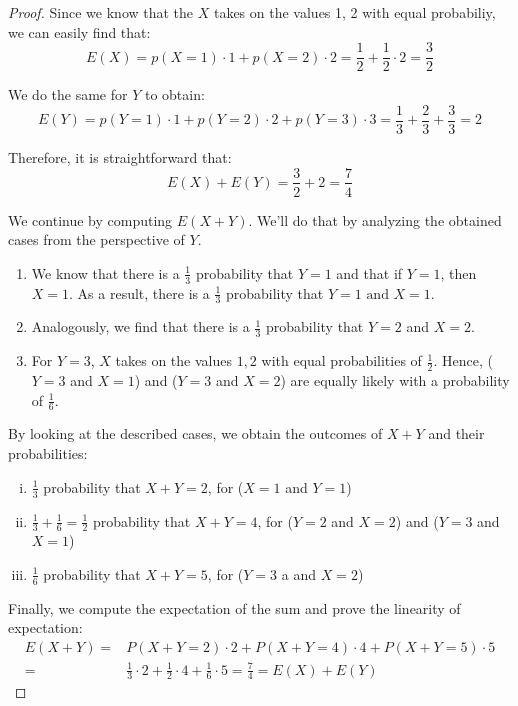 \begin{proof}
    Since we know that the $X$ takes on the values 1, 2 with equal probabiliy, we can easily find that:
     \[
         E(X) = p(X = 1) \cdot 1 + p(X = 2) \cdot 2 = \frac{1}{2} + \frac{1}{2} \cdot 2 =\frac{3}{2}
    \] 

    We do the same for $Y$ to obtain:
    \[
        E(Y) = p(Y = 1) \cdot 1 + p(Y = 2) \cdot 2 + p(Y = 3) \cdot 3 
        = \frac{1}{3} + \frac{2}{3} + \frac{3}{3} = 2
    \] 

    Therefore, it is straightforward that:
    \[
        E(X) + E(Y) = \frac{3}{2} + 2 = \frac{7}{4}
    \] 

    We continue by computing $E(X + Y)$. We'll do that by analyzing the obtained cases from the perspective
    of  $Y$. 
    \begin{enumerate}[(1)]
        \item We know that there is a  $\frac{1}{3}$ probability that $Y = 1$ and that if $Y = 1$, then $X = 1$.
            As a result, there is a $\frac{1}{3}$ probability that $Y = 1 \text{ and } X = 1$.

        \item Analogously, we find that there is a $\frac{1}{3}$ probability that $Y = 2$ and $X = 2$.

        \item For $Y = 3$, $X$ takes on the values $1, 2$ with equal probabilities of $\frac{1}{2}$. Hence,
            ($Y = 3$ and $X = 1$) and ($Y = 3$ and $X = 2$) are equally likely with a probability 
            of $\frac{1}{6}$.  
    \end{enumerate}

    By looking at the described cases, we obtain the outcomes of $X + Y$ and their probabilities:
    \begin{enumerate}[(i)]
        \item $\frac{1}{3}$ probability that $X + Y = 2$, for ($X = 1$ and $Y = 1$)

        \item $\frac{1}{3} + \frac{1}{6} = \frac{1}{2}$ probability that $X + Y = 4$, for ($Y = 2$ and $X = 2$)
    and ($Y = 3$ and  $X = 1$)

    \item $\frac{1}{6}$ probability that $X + Y = 5$, for ($Y = 3$ a and $X = 2$)
    \end{enumerate}

    Finally, we compute the expectation of the sum and prove the linearity of expectation:
    \begin{align*}
        E(X + Y) =& P(X + Y = 2) \cdot 2 + P(X + Y = 4) \cdot 4 + P(X + Y = 5) \cdot 5 \\
        =& \frac{1}{3} \cdot 2 + \frac{1}{2} \cdot 4 + \frac{1}{6} \cdot 5 = \frac{7}{4} = E(X) + E(Y) 
    \end{align*}
\end{proof}

